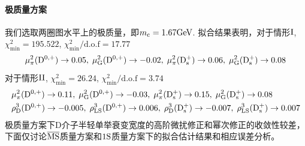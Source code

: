 \paragraph{极质量方案}
我们选取两圈图水平上的极质量，即$m_{\mathrm{c}}=1.67\mathrm{GeV}$.
拟合结果表明，对于情形$\mathrm{I}$, $\chi^{2}_{\text{min}}=195.522$, $\chi^{2}_{\text{min}}/\text{d.o.f}=17.77$
\begin{equation}
    \mu_{\pi}^2(\mathrm{D^{0,+}})\to 0.05,\;\mu_{\mathrm{G}}^{2}(\mathrm{D^{0,+}})\to -0.02, \;\mu_{\pi}^2(\mathrm{D_s^+})\to 0.06, \;\mu_{\mathrm{G}}^{2}(\mathrm{D_s^+})\to 0.08
\end{equation}
对于情形$\mathrm{II}$, $\chi^{2}_{\text{min}}=26.24$, $\chi^{2}_{\text{min}}/\text{d.o.f}=3.74$
\begin{equation}
    \begin{aligned}
        &\mu_{\pi}^2(\mathrm{D^{0,+}})\to 0.11,\;\mu_{\mathrm{G}}^{2}(\mathrm{D^{0,+}})\to -0.03, \;\mu_{\pi}^2(\mathrm{D_s^+})\to 0.15, \;\mu_{\mathrm{G}}^{2}(\mathrm{D_s^+})\to 0.08\\
        &\rho_{\mathrm{D}}^3(\mathrm{D^{0,+}})\to -0.005,\;\rho_{\mathrm{LS}}^3(\mathrm{D^{0,+}})\to 0.006, \;\rho_{\mathrm{D}}^3(\mathrm{D_s^+})\to -0.007, \;\rho_{\mathrm{LS}}^3(\mathrm{D_s^+})\to 0.007
    \end{aligned}
\end{equation}
极质量方案下D介子半轻单举衰变宽度的高阶微扰修正和幂次修正的收敛性较差，下面仅讨论$\overline{\mathrm{MS}}$质量方案和$\mathrm{1S}$质量方案下的拟合估计结果和相应误差分析。
